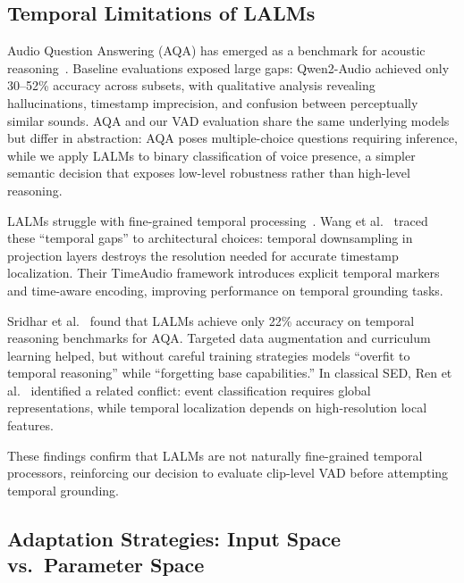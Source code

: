 \documentclass[11pt,a4paper]{article}
\begin{document}
\subsection{Temporal Limitations of LALMs}
\label{subsec:temporal_limitations}

Audio Question Answering (AQA) has emerged as a benchmark for acoustic reasoning~\cite{yang2025multi,dcase2025task5aqa}. Baseline evaluations exposed large gaps: Qwen2-Audio achieved only 30--52\% accuracy across subsets, with qualitative analysis revealing hallucinations, timestamp imprecision, and confusion between perceptually similar sounds. AQA and our VAD evaluation share the same underlying models but differ in abstraction: AQA poses multiple-choice questions requiring inference, while we apply LALMs to binary classification of voice presence, a simpler semantic decision that exposes low-level robustness rather than high-level reasoning.

LALMs struggle with fine-grained temporal processing~\cite{wang2025timeaudio,sridhar-etal-2025-enhancing}. Wang et al.~\cite{wang2025timeaudio} traced these ``temporal gaps'' to architectural choices: temporal downsampling in projection layers destroys the resolution needed for accurate timestamp localization. Their TimeAudio framework introduces explicit temporal markers and time-aware encoding, improving performance on temporal grounding tasks.

Sridhar et al.~\cite{sridhar-etal-2025-enhancing} found that LALMs achieve only 22\% accuracy on temporal reasoning benchmarks for AQA. Targeted data augmentation and curriculum learning helped, but without careful training strategies models ``overfit to temporal reasoning'' while ``forgetting base capabilities.'' In classical SED, Ren et al.~\cite{ren2025group} identified a related conflict: event classification requires global representations, while temporal localization depends on high-resolution local features.

These findings confirm that LALMs are not naturally fine-grained temporal processors, reinforcing our decision to evaluate clip-level VAD before attempting temporal grounding.

\subsection{Adaptation Strategies: Input Space vs.\ Parameter Space}
\label{subsec:adaptation}
\end{document}
